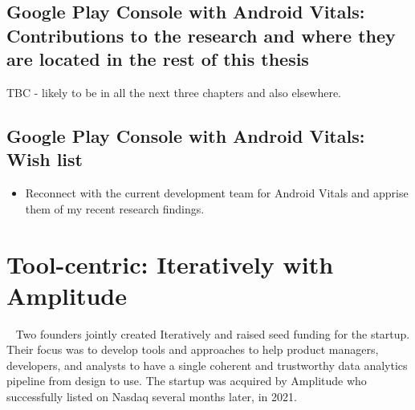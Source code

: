 \subsection{Google Play Console with Android Vitals: Contributions to the research and where they are located in the rest of this thesis}
TBC - likely to be in all the next three chapters and also elsewhere.

\subsection*{Google Play Console with Android Vitals: Wish list}
{\small
\begin{itemize}
    \item Reconnect with the current development team for Android Vitals and apprise them of my recent research findings.
\end{itemize}
}

\clearpage


\section{Tool-centric: Iteratively with Amplitude}~\label{case-study-overview-iteratively-with-amplitude}
Two founders jointly created Iteratively and raised seed funding for the startup. Their focus was to develop tools and approaches to help product managers, developers, and analysts to have a single coherent and trustworthy data analytics pipeline from design to use. The startup was acquired by Amplitude who successfully listed on Nasdaq several months later, in 2021. 

